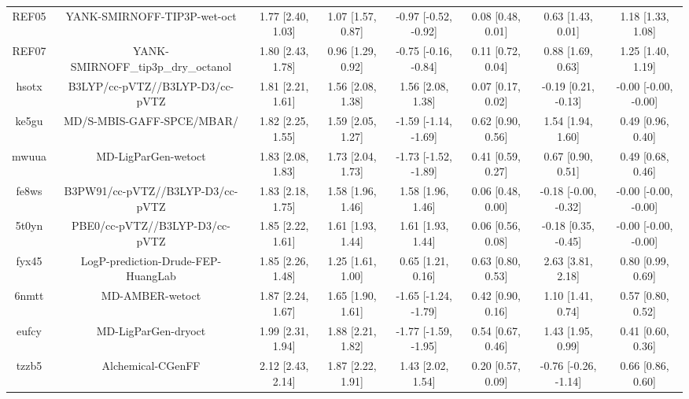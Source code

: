 \documentclass{article}
\begin{document}
\begin{center}
\begin{longtable}{|cccccccc|}
 REF05 &                        YANK-SMIRNOFF-TIP3P-wet-oct &  1.77 [2.40, 1.03] &  1.07 [1.57, 0.87] &  -0.97 [-0.52, -0.92] &  0.08 [0.48, 0.01] &     0.63 [1.43, 0.01] &     1.18 [1.33, 1.08] \\
 REF07 &                 YANK-SMIRNOFF\_tip3p\_dry\_octanol &  1.80 [2.43, 1.78] &  0.96 [1.29, 0.92] &  -0.75 [-0.16, -0.84] &  0.11 [0.72, 0.04] &     0.88 [1.69, 0.63] &     1.25 [1.40, 1.19] \\
 hsotx &                    B3LYP/cc-pVTZ//B3LYP-D3/cc-pVTZ &  1.81 [2.21, 1.61] &  1.56 [2.08, 1.38] &     1.56 [2.08, 1.38] &  0.07 [0.17, 0.02] &   -0.19 [0.21, -0.13] &  -0.00 [-0.00, -0.00] \\
 ke5gu &                          MD/S-MBIS-GAFF-SPCE/MBAR/ &  1.82 [2.25, 1.55] &  1.59 [2.05, 1.27] &  -1.59 [-1.14, -1.69] &  0.62 [0.90, 0.56] &     1.54 [1.94, 1.60] &     0.49 [0.96, 0.40] \\
 mwuua &                                MD-LigParGen-wetoct &  1.83 [2.08, 1.83] &  1.73 [2.04, 1.73] &  -1.73 [-1.52, -1.89] &  0.41 [0.59, 0.27] &     0.67 [0.90, 0.51] &     0.49 [0.68, 0.46] \\
 fe8ws &                   B3PW91/cc-pVTZ//B3LYP-D3/cc-pVTZ &  1.83 [2.18, 1.75] &  1.58 [1.96, 1.46] &     1.58 [1.96, 1.46] &  0.06 [0.48, 0.00] &  -0.18 [-0.00, -0.32] &  -0.00 [-0.00, -0.00] \\
 5t0yn &                     PBE0/cc-pVTZ//B3LYP-D3/cc-pVTZ &  1.85 [2.22, 1.61] &  1.61 [1.93, 1.44] &     1.61 [1.93, 1.44] &  0.06 [0.56, 0.08] &   -0.18 [0.35, -0.45] &  -0.00 [-0.00, -0.00] \\
 fyx45 &                 LogP-prediction-Drude-FEP-HuangLab &  1.85 [2.26, 1.48] &  1.25 [1.61, 1.00] &     0.65 [1.21, 0.16] &  0.63 [0.80, 0.53] &     2.63 [3.81, 2.18] &     0.80 [0.99, 0.69] \\
 6nmtt &                                    MD-AMBER-wetoct &  1.87 [2.24, 1.67] &  1.65 [1.90, 1.61] &  -1.65 [-1.24, -1.79] &  0.42 [0.90, 0.16] &     1.10 [1.41, 0.74] &     0.57 [0.80, 0.52] \\
 eufcy &                                MD-LigParGen-dryoct &  1.99 [2.31, 1.94] &  1.88 [2.21, 1.82] &  -1.77 [-1.59, -1.95] &  0.54 [0.67, 0.46] &     1.43 [1.95, 0.99] &     0.41 [0.60, 0.36] \\
 tzzb5 &                                  Alchemical-CGenFF &  2.12 [2.43, 2.14] &  1.87 [2.22, 1.91] &     1.43 [2.02, 1.54] &  0.20 [0.57, 0.09] &  -0.76 [-0.26, -1.14] &     0.66 [0.86, 0.60] \\

\end{longtable}
\end{center}
\end{document}
